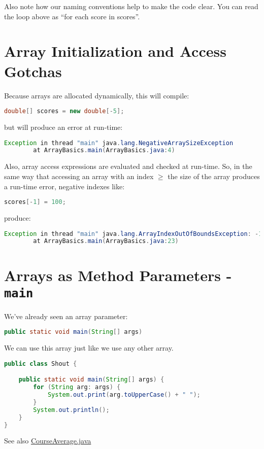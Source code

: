 \documentclass{article}
\begin{document}
Also note how our naming conventions help to make the code clear.  You can read the loop above as ``for each score in scores''.


\section{Array Initialization and Access Gotchas}


Because arrays are allocated dynamically, this will compile:
\begin{lstlisting}[language=Java]
double[] scores = new double[-5];
\end{lstlisting}
but will produce an error at run-time:
\begin{lstlisting}[language=Java]
Exception in thread "main" java.lang.NegativeArraySizeException
        at ArrayBasics.main(ArrayBasics.java:4)
\end{lstlisting}

Also, array access expressions are evaluated and checked at run-time.  So, in the same way that accessing an array with an index $\ge$ the size of the array produces a run-time error, negative indexes like:

\begin{lstlisting}[language=Java]
scores[-1] = 100;
\end{lstlisting}
produce:
\begin{lstlisting}[language=Java]
Exception in thread "main" java.lang.ArrayIndexOutOfBoundsException: -1
        at ArrayBasics.main(ArrayBasics.java:23)
\end{lstlisting}

\section{Arrays as Method Parameters - {\tt main}}


We've already seen an array parameter:
\begin{lstlisting}[language=Java]
public static void main(String[] args)
\end{lstlisting}

We can use this array just like we use any other array.
\begin{lstlisting}[language=Java]
public class Shout {

    public static void main(String[] args) {
        for (String arg: args) {
            System.out.print(arg.toUpperCase() + " ");
        }
        System.out.println();
    }
}
\end{lstlisting}
See also \href{\code/arrays/CourseAverage.java}{CourseAverage.java}
\end{document}
